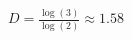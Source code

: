 \documentclass[preview]{standalone}
\begin{document}
\begin{align*}
D = \frac{\log(3)}{\log(2)} \approx 1.58
\end{align*}
\end{document}
